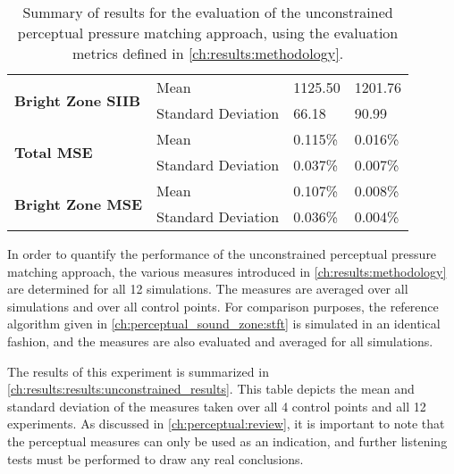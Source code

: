 \begin{table}[]
\begin{tabular}{|l|l|l|l|}
\multirow{2}{*}{\textbf{Bright Zone SIIB}}  & Mean               & 1125.50                           & 1201.76            \\
                                            & Standard Deviation & 66.18                             & 90.99              \\ \hline
\multirow{2}{*}{\textbf{Total MSE}}         & Mean               & 0.115\%                           & 0.016\%            \\
                                            & Standard Deviation & 0.037\%                           & 0.007\%            \\ \hline
\multirow{2}{*}{\textbf{Bright Zone MSE}}   & Mean               & 0.107\%                           & 0.008\%            \\
                                            & Standard Deviation & 0.036\%                           & 0.004\%            \\ \hline
\end{tabular}
\caption{
    Summary of results for the evaluation of the unconstrained perceptual pressure matching approach,
    using the evaluation metrics defined in \autoref{ch:results:methodology}.
}
\label{ch:results:results:unconstrained_results}
\end{table}

In order to quantify the performance of the unconstrained perceptual pressure matching approach, the various 
measures introduced in \autoref{ch:results:methodology} are determined for all 12 simulations.
The measures are averaged over all simulations and over all control points.
For comparison purposes, the reference algorithm given in \autoref{ch:perceptual_sound_zone:stft} is 
simulated in an identical fashion, and the measures are also evaluated and averaged for all simulations.

The results of this experiment is summarized in \autoref{ch:results:results:unconstrained_results}.
This table depicts the mean and standard deviation of the measures taken over all 4 control points and all 12 experiments.
As discussed in \autoref{ch:perceptual:review}, it is important to note that the perceptual measures can only
be used as an indication, and further listening tests must be performed to draw any real conclusions.

